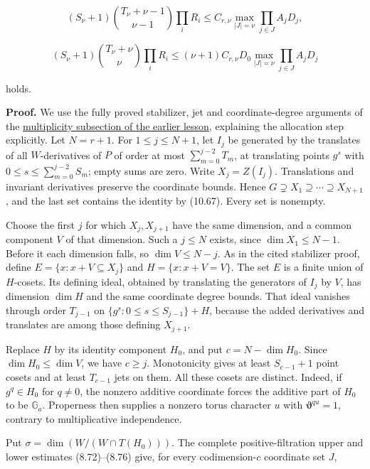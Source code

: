 \documentclass[
  11pt,
  a4paper,
]{article}
\newcounter{none} %
\begin{document}
\[
(S_\nu+1)\binom{T_\nu+\nu-1}{\nu-1}\prod_iR_i
\le C_{r,\nu}\max_{|J|=\nu}\prod_{j\in J}A_jD_j,
\tag{10.69}
\]

\[
(S_\nu+1)\binom{T_\nu+\nu}{\nu}\prod_iR_i
\le(\nu+1)C_{r,\nu}D_0
\max_{|J|=\nu}\prod_{j\in J}A_jD_j
\tag{10.70}
\]

holds.

\textbf{Proof.} We use the fully proved stabilizer, jet and
coordinate-degree arguments of the
\href{../TR-BAKER-08.html\#intersections-and-the-multiplicity-estimate}{multiplicity
subsection of the earlier lesson}, explaining the allocation step
explicitly. Let \(N=r+1\). For \(1\le j\le N+1\), let \(I_j\) be
generated by the translates of all \(W\)-derivatives of \(P\) of order
at most \(\sum_{m=0}^{j-2}T_m\), at translating points \(g^s\) with
\(0\le s\le\sum_{m=0}^{j-2}S_m\); empty sums are zero. Write
\(X_j=Z(I_j)\). Translations and invariant derivatives preserve the
coordinate bounds. Hence
\(G\supsetneq X_1\supseteq\cdots\supseteq X_{N+1}\), and the last set
contains the identity by (10.67). Every set is nonempty.

Choose the first \(j\) for which \(X_j,X_{j+1}\) have the same
dimension, and a common component \(V\) of that dimension. Such a
\(j\le N\) exists, since \(\dim X_1\le N-1\). Before it each dimension
falls, so \(\dim V\le N-j\). As in the cited stabilizer proof, define
\(E=\{x:x+V\subseteq X_j\}\) and \(H=\{x:x+V=V\}\). The set \(E\) is a
finite union of \(H\)-cosets. Its defining ideal, obtained by
translating the generators of \(I_j\) by \(V\), has dimension \(\dim H\)
and the same coordinate degree bounds. That ideal vanishes through order
\(T_{j-1}\) on \(\{g^s:0\le s\le S_{j-1}\}+H\), because the added
derivatives and translates are among those defining \(X_{j+1}\).

Replace \(H\) by its identity component \(H_0\), and put
\(c=N-\dim H_0\). Since \(\dim H_0\le\dim V\), we have \(c\ge j\).
Monotonicity gives at least \(S_{c-1}+1\) point cosets and at least
\(T_{c-1}\) jets on them. All these cosets are distinct. Indeed, if
\(g^q\in H_0\) for \(q\ne0\), the nonzero additive coordinate forces the
additive part of \(H_0\) to be \(\mathbb G_a\). Properness then supplies
a nonzero torus character \(u\) with \(\boldsymbol\vartheta^{qu}=1\),
contrary to multiplicative independence.

Put \(\sigma=\dim(W/(W\cap T(H_0)))\). The complete positive-filtration
upper and lower estimates (8.72)--(8.76) give, for every
codimension-\(c\) coordinate set \(J\),
\end{document}
